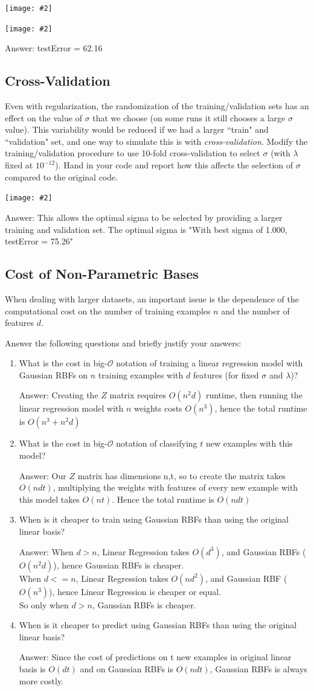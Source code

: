 \documentclass{article}
\def\ans#1{\par\gre{Answer: #1}}
\def\blu#1{{\color{blu}#1}}
\def\gre#1{{\color{gre}#1}}
\newcommand{\centerfig}[2]{\begin{center}\texttt{[image: \#2]}\end{center}}
\def\enum#1{\begin{enumerate}#1\end{enumerate}}
\begin{document}
\centerfig{0.8}{q1.1-code1}
\centerfig{0.8}{q1.1-code2}
\ans{testError = 62.16}

\pagebreak


\subsection{Cross-Validation}

Even with regularization, the randomization of the training/validation sets has an effect on the value of $\sigma$ that we choose (on some runs it still chooses a large $\sigma$ value).
This variability would be reduced if we had a larger ``train" and ``validation" set, and one way to simulate this is with \emph{cross-validation}. \blu{Modify the training/validation procedure to use 10-fold cross-validation to select $\sigma$ (with $\lambda$ fixed at $10^{-12}$). Hand in your code and report how this affects the selection of $\sigma$ compared to the original code.}
\centerfig{0.8}{q1.2-code}
\ans{This allows the optimal sigma to be selected by providing a larger training and validation set. The optimal sigma is "With best sigma of 1.000, testError = 75.26"}

\pagebreak

\subsection{Cost of Non-Parametric Bases}

When dealing with larger datasets, an important issue is the dependence of the computational cost on the number of training examples $n$ and the number of features $d$.

\blu{Answer the following questions and briefly justify your answers:
\enum{
\item What is the cost in big-$\mathcal{O}$ notation of training a linear regression model with Gaussian RBFs on $n$ training examples with $d$ features (for fixed $\sigma$ and $\lambda$)?
\ans{Creating the $Z$ matrix requires $O(n^2d)$ runtime, then running the linear regression model with $n$ weights costs $O(n^3)$, hence the total runtime is $O(n^3+n^2d)$}
\item What is the cost in big-$\mathcal{O}$ notation of classifying $t$ new examples with this model?
\ans{Our $Z$ matrix has dimensions n,t, so to create the matrix takes $O(ndt)$, multiplying the weights with features of every new example with this model takes $O(nt)$. Hence the total runtime is $O(ndt)$}
\item When is it cheaper to train using Gaussian RBFs than using the original linear basis?
\ans{When $d > n$, Linear Regression takes $O(d^3)$, and Gaussian RBFs ($O(n^2d)$), hence Gaussian RBFs is cheaper. 
\\
When $d <= n$, Linear Regression takes $O(nd^2)$, and Gaussian RBF ($O(n^3)$), hence Linear Regression is cheaper or equal.
\\
So only when $d > n$, Gaussian RBFs is cheaper.
}
\item When is it cheaper to predict using Gaussian RBFs than using the original linear basis?
\ans{Since the cost of predictions on t new examples in original linear basis is $O(dt)$ and on Gaussian RBFs is $O(ndt)$, Gaussian RBFs is always more costly. }
}}
\end{document}

